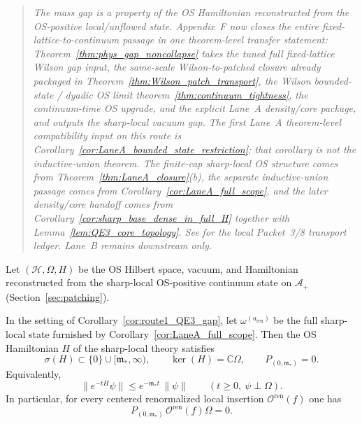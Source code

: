 \begin{quote}
\emph{The mass gap is a property of the OS Hamiltonian reconstructed from the OS-positive local/unflowed state.
Appendix~F now closes the entire fixed-lattice-to-continuum passage in one theorem-level transfer statement: Theorem~\ref{thm:phys_gap_noncollapse} takes the tuned full fixed-lattice Wilson gap input, the same-scale Wilson-to-patched closure already packaged in Theorem~\ref{thm:Wilson_patch_transport}, the Wilson bounded-state / dyadic OS limit theorem~\ref{thm:continuum_tightness}, the continuum-time OS upgrade, and the explicit Lane~A density/core package, and outputs the sharp-local vacuum gap.
The first Lane~A theorem-level compatibility input on this route is Corollary~\ref{cor:LaneA_bounded_state_restriction}; that corollary is not the inductive-union theorem. The finite-cap sharp-local OS structure comes from Theorem~\ref{thm:LaneA_closure}(b), the separate inductive-union passage comes from Corollary~\ref{cor:LaneA_full_scope}, and the later density/core handoff comes from Corollary~\ref{cor:sharp_base_dense_in_full_H} together with Lemma~\ref{lem:QE3_core_topology}. See  for the local Packet~3/8 transport ledger. Lane~B remains downstream only.}
\end{quote}

Let $(\mathcal H,\Omega,H)$ be the OS Hilbert space, vacuum, and Hamiltonian reconstructed from the sharp-local OS-positive continuum state on $\mathcal A_+$
(Section~\ref{sec:patching}).

\begin{theorem}\label{thm:gap_transfer}
In the setting of Corollary~\ref{cor:route1_QE3_gap}, let $\omega^{(u_{\mathrm{ren}})}$ be the full sharp-local state furnished by Corollary~\ref{cor:LaneA_full_scope}.
Then the OS Hamiltonian $H$ of the sharp-local theory satisfies
\[
\sigma(H)\subset\{0\}\cup[\mathfrak m_\ast,\infty),
\qquad
\ker(H)=\mathbb C\Omega,
\qquad
P_{(0,\mathfrak m_\ast)}=0.
\]
Equivalently,
\[
\|e^{-tH}\psi\|\le e^{-\mathfrak m_\ast t}\,\|\psi\|
\qquad (t\ge 0,\ \psi\perp\Omega).
\]
In particular, for every centered renormalized local insertion $\mathcal O^{\mathrm{ren}}(f)$ one has
\[
P_{(0,\mathfrak m_\ast)}\,\mathcal O^{\mathrm{ren}}(f)\Omega=0.
\]
\end{theorem}


